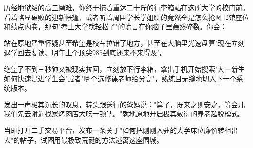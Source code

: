 \documentclass{exam-zh}
\begin{document}
\begin{question}[points = 5]
  历经地狱级的高三磨难，你终于拖着重达二十斤的行李箱站在这所大学的校门前。看着略显破败的迎新帐篷，或者听着周围学长学姐聊的竟然全是怎么抢图书馆座位和绩点内卷，那句"考上大学就轻松了"的谎言在你脑子里轰然碎裂。你会：
  \begin{choices}
    \item 站在原地严重怀疑甚至希望是校车拉错了地方，甚至在大脑里光速盘算"现在立刻退学回去复读、明年上个顶尖985到底还来不来得及"。
    \item 绝望了不到三秒钟又被现实拉回，立刻放下行李箱，拿出手机开始搜索"大一新生如何快速混进学生会"或者"哪个选修课老师给分高"，熟练且无缝地切入下一个系统版本。
    \item 发出一声极其沉长的叹息，转头跟送行的爸妈说："算了，既来之则安之，等会儿我们先去附近找家烤肉店大吃一顿吧。"就地原地开启极其敷衍的养老超脱模式。
    \item 当即打开二手交易平台，发布一条关于"如何把刚刚入驻的大学床位廉价转租出去"的帖子，试图用最极致荒诞的方法逃离这座围城。
  \end{choices}
\end{question}
\end{document}
